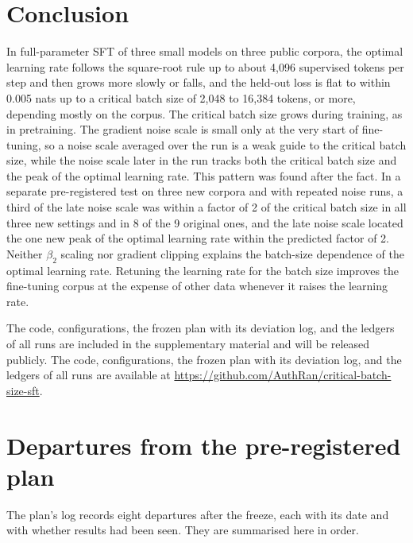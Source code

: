 \documentclass[10pt]{article}
\begin{document}
\section{Conclusion}\label{sec:conclusion}

In full-parameter SFT of three small models on three public corpora, the optimal learning rate follows the square-root rule up to about 4,096 supervised tokens per step and then grows more slowly or falls, and the held-out loss is flat to within 0.005 nats up to a critical batch size of 2,048 to 16,384 tokens, or more, depending mostly on the corpus. The critical batch size grows during training, as in pretraining. The gradient noise scale is small only at the very start of fine-tuning, so a noise scale averaged over the run is a weak guide to the critical batch size, while the noise scale later in the run tracks both the critical batch size and the peak of the optimal learning rate. This pattern was found after the fact. In a separate pre-registered test on three new corpora and with repeated noise runs, a third of the late noise scale was within a factor of 2 of the critical batch size in all three new settings and in 8 of the 9 original ones, and the late noise scale located the one new peak of the optimal learning rate within the predicted factor of 2. Neither $\beta_2$ scaling nor gradient clipping explains the batch-size dependence of the optimal learning rate. Retuning the learning rate for the batch size improves the fine-tuning corpus at the expense of other data whenever it raises the learning rate.

\ifdefined\anonsubmission
The code, configurations, the frozen plan with its deviation log, and the ledgers of all runs are included in the supplementary material and will be released publicly.
\else
The code, configurations, the frozen plan with its deviation log, and the ledgers of all runs are available at \url{https://github.com/AuthRan/critical-batch-size-sft}.
\fi




\appendix

\section{Departures from the pre-registered plan}\label{app:deviations}

The plan's log records eight departures after the freeze, each with its date and with whether results had been seen. They are summarised here in order.
\end{document}
